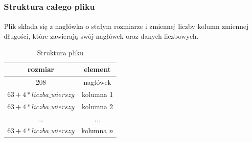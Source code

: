 \documentclass[12pt]{report}
\begin{document}
	\subsubsection{Struktura całego pliku}
	\paragraph{}
	Plik składa się z nagłówka o stałym rozmiarze i zmiennej liczby kolumn zmiennej długości, które zawierają swój nagłówek oraz danych liczbowych.
	
	\begin{table}[H]
		\centering
		\caption{Struktura pliku}
		\begin{tabular}{|c|c|} \hline
			rozmiar  & element \\\hline
			\hline
			208 & nagłówek  \\\hline
			$63+4*liczba\_wierszy$  & kolumna 1 \\\hline
			$63+4*liczba\_wierszy$  & kolumna 2 \\\hline
			...  & ... \\\hline
			$63+4*liczba\_wierszy$  & kolumna $n$ \\\hline
		\end{tabular}
	\end{table}
	
\end{document}
